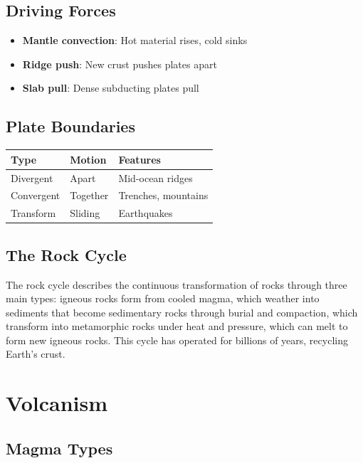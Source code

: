 \documentclass[
  11pt,
  letterpaper,
  twoside,
  openright]{book}
\providecommand{\tightlist}{%
  \setlength{\itemsep}{0pt}\setlength{\parskip}{0pt}}
\begin{document}
\subsection{Driving Forces}\label{driving-forces}

\begin{itemize}
\tightlist
\item
  \textbf{Mantle convection}: Hot material rises, cold sinks
\item
  \textbf{Ridge push}: New crust pushes plates apart
\item
  \textbf{Slab pull}: Dense subducting plates pull
\end{itemize}

\subsection{Plate Boundaries}\label{plate-boundaries}

\begin{longtable}[]{@{}lll@{}}
\toprule\noalign{}
Type & Motion & Features \\
\midrule\noalign{}
\endhead
\bottomrule\noalign{}
\endlastfoot
Divergent & Apart & Mid-ocean ridges \\
Convergent & Together & Trenches, mountains \\
Transform & Sliding & Earthquakes \\
\end{longtable}

\subsection{The Rock Cycle}\label{the-rock-cycle}

The rock cycle describes the continuous transformation of rocks through
three main types: igneous rocks form from cooled magma, which weather
into sediments that become sedimentary rocks through burial and
compaction, which transform into metamorphic rocks under heat and
pressure, which can melt to form new igneous rocks. This cycle has
operated for billions of years, recycling Earth's crust.

\section{Volcanism}\label{volcanism}

\subsection{Magma Types}\label{magma-types}
\end{document}
